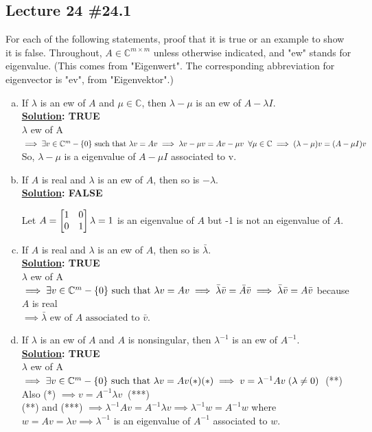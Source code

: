 \documentclass[11pt]{article}
\begin{document}
\subsection*{Lecture 24 \#24.1}
For each of the following statements, proof that it is true or an example to show it is false. Throughout, $A \in \mathbb{C}^{m \times m}$ unless otherwise indicated, and "ew" stands for eigenvalue. (This comes from "Eigenwert". The corresponding abbreviation for eigenvector is "ev", from "Eigenvektor".)
\begin{enumerate}[(a)]
\item If $\lambda$ is an ew of $A$ and $\mu \in \mathbb{C}$, then $\lambda - \mu$ is an ew of $A - \lambda I.$\\
\textbf{\underline{Solution}: TRUE} \\
 $\lambda$ ew of A $\implies \exists v \in \mathbb{C}^m-\{0\} \text{ such that }  \lambda v = Av\\
 \implies \lambda v - \mu v = Av - \mu v\;\; \forall \mu \in \mathbb{C}
\implies (\lambda - \mu)v = (A - \mu I)v$\\
So, $\lambda - \mu$ is a eigenvalue of $A-\mu I$ associated to v.

\item If $A$ is real and $\lambda$ is an ew of $A$, then so is $-\lambda.$\\
\textbf{\underline{Solution}: FALSE} 

Let $ A = 
\begin{bmatrix}
1 & 0\\
0 & 1
\end{bmatrix}\\\\
\lambda = 1$ is an eigenvalue of $A$  but -1 is not an eigenvalue of $A$.

\item If $A$ is real and $\lambda$ is an ew of $A$, then so is $\bar{\lambda}.$\\
\textbf{\underline{Solution}: TRUE} \\
 $\lambda$ ew of A $\implies \exists v \in \mathbb{C}^m-\{0\} \text{ such that }  \lambda v = Av\\
\implies {\bar{\lambda}}\bar{v} = \bar{A} \bar{v} \implies  {\bar{\lambda}}\bar{v} = A \bar{v}$  because $A$ is real\\
$\implies\bar{\lambda} \text{ ew of } A \text{ associated to } \bar{v}.$


\item If $\lambda$ is an ew of $A$ and $A$ is nonsingular, then $\lambda^{-1}$ is an ew of $A^{-1}.$\\
\textbf{\underline{Solution}: TRUE} \\
 $\lambda$ ew of A $\implies \exists v \in \mathbb{C}^m-\{0\} \text{ such that }  \lambda v = Av (*)\\
(*) \implies v = \lambda^{-1}Av \; (\lambda \ne 0)\;\; $(**) \\
Also (*) $\implies v = A^{-1} \lambda v \;\;$(***)\\
(**) and (***) $\implies \lambda^{-1}Av = A^{-1} \lambda v
\implies \lambda^{-1}w = A^{-1}w$ where $w = Av = \lambda v
\implies \lambda^{-1}$ is an eigenvalue of $A^{-1}$ associated to $w$.



\end{enumerate}
\end{document}
